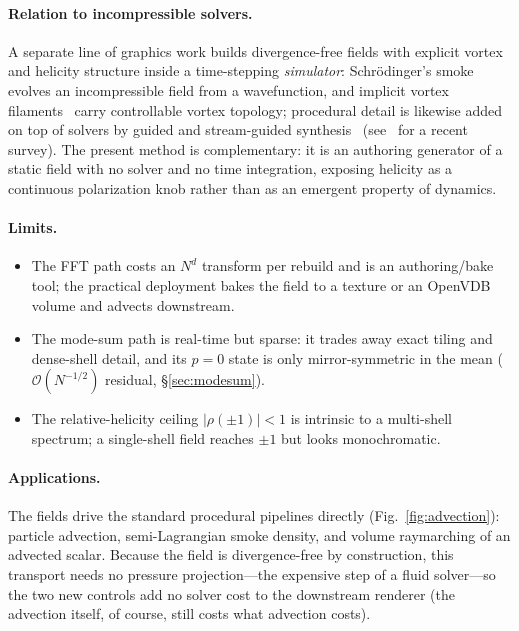 \documentclass[11pt]{article}
\theoremstyle{remark}
\begin{document}
\paragraph{Relation to incompressible solvers.} A separate line of graphics work builds
divergence-free fields with explicit vortex and helicity structure inside a time-stepping
\emph{simulator}: Schr\"odinger's smoke~\cite{chern2016} evolves an incompressible field from a
wavefunction, and implicit vortex filaments~\cite{ishida2022} carry controllable vortex
topology; procedural detail is likewise added on top of solvers by guided and stream-guided
synthesis~\cite{kim2008,sato2021} (see~\cite{wang2024} for a recent survey). The present method
is complementary: it is an authoring generator of a static field with no solver and no time
integration, exposing helicity as a continuous polarization knob rather than as an emergent
property of dynamics.

\paragraph{Limits.}
\begin{itemize}[nosep]
\item The FFT path costs an $N^d$ transform per rebuild and is an authoring/bake tool; the
practical deployment bakes the field to a texture or an OpenVDB volume and advects downstream.
\item The mode-sum path is real-time but sparse: it trades away exact tiling and dense-shell
detail, and its $p=0$ state is only mirror-symmetric in the mean ($\mathcal O(N^{-1/2})$
residual, \S\ref{sec:modesum}).
\item The relative-helicity ceiling $|\rho(\pm1)|<1$ is intrinsic to a multi-shell spectrum;
a single-shell field reaches $\pm1$ but looks monochromatic.
\end{itemize}

\paragraph{Applications.} The fields drive the standard procedural pipelines directly
(Fig.~\ref{fig:advection}):
particle advection, semi-Lagrangian smoke density, and volume raymarching of an advected
scalar. Because the field is divergence-free by construction, this transport needs no pressure
projection---the expensive step of a fluid solver---so the two new controls add no solver
cost to the downstream renderer (the advection itself, of course, still costs what advection
costs).
\end{document}
